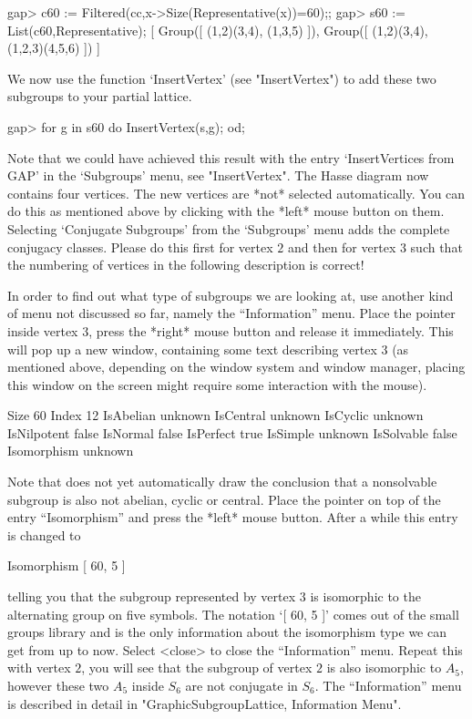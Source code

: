\begintt
gap> c60 := Filtered(cc,x->Size(Representative(x))=60);;
gap> s60 := List(c60,Representative);
[ Group([ (1,2)(3,4), (1,3,5) ]), Group([ (1,2)(3,4), (1,2,3)(4,5,6) ]) ]
\endtt

\label{xgapgap}
We now use the function `InsertVertex' (see "InsertVertex") to add
these two subgroups to your partial lattice.

\begintt
gap> for g in s60 do InsertVertex(s,g); od;
\endtt

Note  that  we  could have    achieved   this result  with the   entry
`InsertVertices from GAP'  in   the    `Subgroups'  menu,   see
"InsertVertex".  The  Hasse diagram now  contains  four vertices.  The
new  vertices are  *not* selected automatically.   You can do  this as
mentioned above  by clicking with  the *left*  mouse button on  them.  
Selecting `Conjugate Subgroups' from the `Subgroups' menu adds the
complete conjugacy classes.  Please do  this first for vertex $2$  and
then   for vertex $3$   such that  the  numbering of  vertices  in the
following description is correct!

In order  to find out  what type of subgroups  we  are looking at, use
another  kind of menu not  discussed  so far, namely the ``Information''
menu.  Place the pointer inside  vertex $3$,  press the *right*  mouse
button and release  it immediately.  This  will  pop up a  new window,
containing some text    describing  vertex $3$ (as   mentioned  above,
depending on the window system and window manager, placing this window
on the screen might require some interaction with the mouse).

\begintt
Size        60
Index       12
IsAbelian   unknown
IsCentral   unknown
IsCyclic    unknown
IsNilpotent false
IsNormal    false
IsPerfect   true
IsSimple    unknown
IsSolvable  false
Isomorphism unknown
\endtt

Note that {\GAP} does not yet automatically draw the conclusion that a
nonsolvable subgroup  is also not  abelian, cyclic or central.  Place the
pointer on top of the entry ``Isomorphism'' and press the *left* mouse
button.  After a while this entry is changed to

\begintt
Isomorphism [ 60, 5 ]
\endtt

telling you that the subgroup represented by vertex $3$ is isomorphic to
the alternating group on five symbols.  The notation `[ 60, 5 ]' comes out
of the small groups library and is the only information about the
isomorphism type we can get from {} up to now. Select <close> to close
the ``Information'' menu.  Repeat this with vertex $2$, you will see that the
subgroup of vertex $2$ is also isomorphic to $A_5$, however these two $A_5$
inside $S_6$ are not conjugate in $S_6$.  The ``Information'' menu is described
in detail in "GraphicSubgroupLattice, Information Menu".

